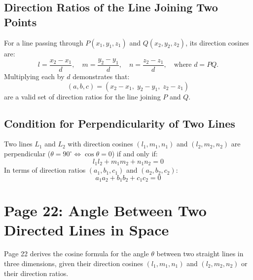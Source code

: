 \subsection{Direction Ratios of the Line Joining Two Points}
For a line passing through $P(x_1, y_1, z_1)$ and $Q(x_2, y_2, z_2)$, its direction cosines are:
\begin{equation}
    l = \frac{x_2 - x_1}{d}, \quad m = \frac{y_2 - y_1}{d}, \quad n = \frac{z_2 - z_1}{d}, \quad \text{where } d = PQ.
\end{equation}
Multiplying each by $d$ demonstrates that:
\begin{equation}
    \boxed{(a, b, c) = (x_2 - x_1, \; y_2 - y_1, \; z_2 - z_1)}
\end{equation}
are a valid set of direction ratios for the line joining $P$ and $Q$.

\subsection{Condition for Perpendicularity of Two Lines}
Two lines $L_1$ and $L_2$ with direction cosines $(l_1, m_1, n_1)$ and $(l_2, m_2, n_2)$ are perpendicular ($\theta = 90^\circ \iff \cos\theta = 0$) if and only if:
\begin{equation}
    \boxed{l_1 l_2 + m_1 m_2 + n_1 n_2 = 0}
\end{equation}
In terms of direction ratios $(a_1, b_1, c_1)$ and $(a_2, b_2, c_2)$:
\begin{equation}
    \boxed{a_1 a_2 + b_1 b_2 + c_1 c_2 = 0}
\end{equation}

\section{Page 22: Angle Between Two Directed Lines in Space}
\label{sec:page22}

\begin{conceptbox}
Page 22 derives the cosine formula for the angle $\theta$ between two straight lines in three dimensions, given their direction cosines $(l_1, m_1, n_1)$ and $(l_2, m_2, n_2)$ or their direction ratios.
\end{conceptbox}

